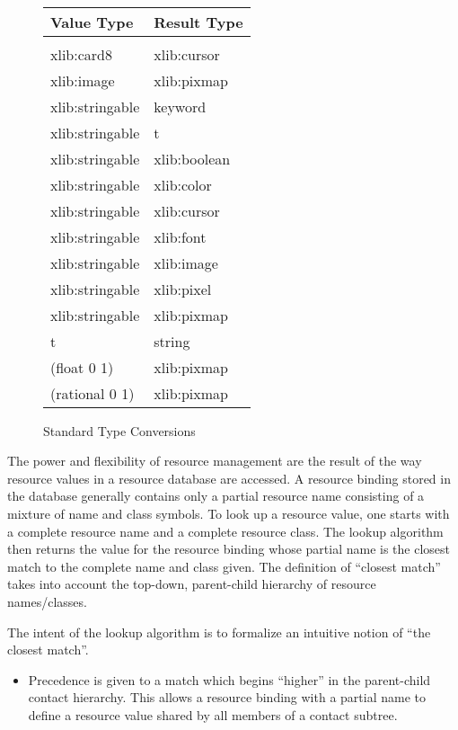 \documentclass[twoside]{book}
\begin{document}
\begin{sloppy}
\begin{figure}[h]
\caption{Standard Type Conversions}
\label{fig:conversions}
\begin{center}
\tt
\begin{tabular}{|ll|} \hline
{\rm Value Type} & {\rm Result Type}\\ \hline
& \\ 
xlib:card8 & xlib:cursor\\ 
xlib:image      & xlib:pixmap \\
xlib:stringable & keyword\\ 
xlib:stringable & t\\ 
xlib:stringable & xlib:boolean \\ 
xlib:stringable & xlib:color\\ 
xlib:stringable & xlib:cursor\\ 
xlib:stringable & xlib:font \\ 
xlib:stringable & xlib:image \\ 
xlib:stringable & xlib:pixel\\ 
xlib:stringable & xlib:pixmap\\ 
t               & string \\
(float 0 1)     & xlib:pixmap \\
(rational 0 1)  & xlib:pixmap \\
\hline
\end{tabular}
\rm
\end{center}
\end{figure}


The power and flexibility of resource management are the result of the way
resource values in a resource database are accessed. A resource binding
stored in
the database generally contains only a partial resource name consisting of a
mixture of name and class symbols. To look up a
resource value, one starts with a complete resource name and a
complete resource class. The lookup algorithm then returns the value
for the resource binding whose partial name is the closest match to the complete
name and class given. The definition of ``closest match'' takes into account
the
top-down, parent-child hierarchy of resource names/classes.



The intent of the lookup  algorithm is to formalize an
intuitive notion of ``the closest match''. 
\begin{itemize} 
\item Precedence is given to a  match which begins ``higher'' in the
parent-child contact hierarchy. This allows a resource binding with a partial
name to define a resource value shared by all members of a contact subtree.


\end{itemize}
\end{sloppy}
\end{document}
